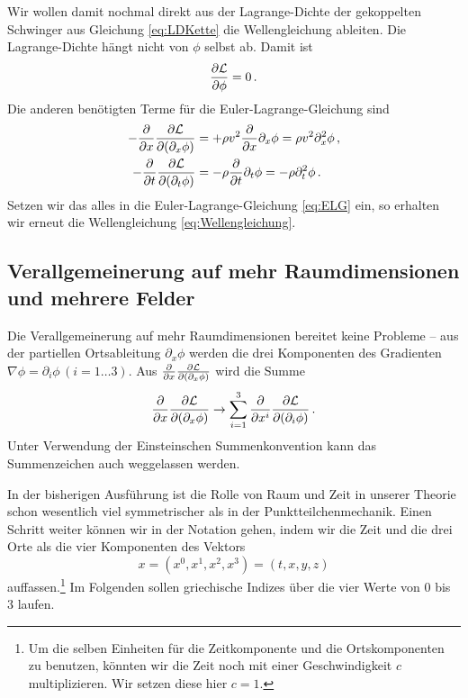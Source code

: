 \documentclass[paper=a4, fontsize=11.0pt, abstractoff, DIV12]{scrartcl}
\newcommand{\LD}{\ensuremath{\mathcal{L}}}
\begin{document}
Wir wollen damit nochmal direkt aus der Lagrange-Dichte der gekoppelten
Schwinger aus Gleichung \eqref{eq:LDKette} die Wellengleichung ableiten.
Die Lagrange-Dichte hängt nicht von $\phi$ selbst ab. Damit ist
\begin{equation}
\firstpderiv{\LD}{\phi} = 0\,.
\end{equation}
Die anderen benötigten Terme für die Euler-Lagrange-Gleichung sind
\begin{align}
-\firstpderiv{}{x}\firstpderiv{\LD}{(\partial_x\phi)} &= +\rho v^2 \firstpderiv{}{x}\partial_x\phi =\rho v^2 \partial_x^2\phi\,,\\
-\firstpderiv{}{t}\firstpderiv{\LD}{(\partial_t\phi)} &= -\rho \firstpderiv{}{t}\partial_t\phi = -\rho \partial_t^2\phi\,.
\end{align}
Setzen wir das alles in die Euler-Lagrange-Gleichung \eqref{eq:ELG} ein, so
erhalten wir  erneut die Wellengleichung \eqref{eq:Wellengleichung}.

\subsection{Verallgemeinerung auf mehr Raumdimensionen und mehrere Felder}

Die Verallgemeinerung auf mehr Raumdimensionen bereitet keine Probleme --
aus der partiellen Ortsableitung $\partial_x\phi$ werden die drei
Komponenten des Gradienten $\nabla \phi = \partial_i\phi\,(i=1\dots3)$. Aus
$\firstpderiv{}{x}\firstpderiv{\LD}{(\partial_x\phi)}$ wird die Summe
\begin{equation}
\firstpderiv{}{x}\firstpderiv{\LD}{(\partial_x\phi)} \to \sum\limits_{i=1}^{3} \firstpderiv{}{x^i}\firstpderiv{\LD}{(\partial_i \phi)}\,.
\end{equation}
Unter Verwendung der Einsteinschen Summenkonvention kann das Summenzeichen
auch weggelassen werden.

In der bisherigen Ausführung ist die Rolle von Raum und Zeit in unserer
Theorie schon wesentlich viel symmetrischer als in der
Punktteilchenmechanik. Einen Schritt weiter können wir in der Notation
gehen, indem wir die Zeit und die drei Orte als die vier Komponenten des
Vektors
\begin{equation}
x = \left(x^0, x^1, x^2, x^3\right) = (t, x, y, z)
\end{equation}
auffassen.\footnote{Um die selben Einheiten für die Zeitkomponente und die
Ortskomponenten zu benutzen, könnten wir die Zeit noch mit einer
Geschwindigkeit $c$ multiplizieren. Wir setzen diese hier $c=1$.} Im
Folgenden sollen griechische Indizes über die vier Werte von $0$ bis $3$
laufen.
\end{document}
